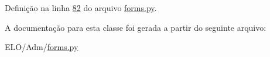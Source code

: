 Definição na linha \hyperlink{Adm_2forms_8py_source_l00082}{82} do arquivo \hyperlink{Adm_2forms_8py_source}{forms.\-py}.



A documentação para esta classe foi gerada a partir do seguinte arquivo\-:\begin{DoxyCompactItemize}
\item 
E\-L\-O/\-Adm/\hyperlink{Adm_2forms_8py}{forms.\-py}\end{DoxyCompactItemize}
